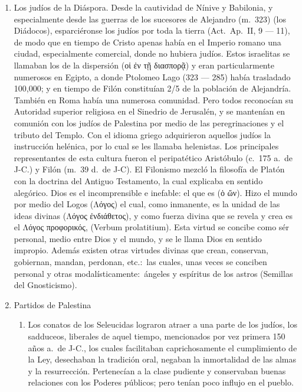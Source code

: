 \raggedbottom{} \documentclass[12pt, a4paper]{book}
\begin{document}
\begin{enumerate}
  \item Los judíos de la Diáspora. Desde la cautividad de Nínive y Babilonia, y especialmente desde las guerras de los sucesores de Alejandro (m.\ 323) (los Diádocos), esparciéronse los judíos por toda la tierra (Act.\ Ap.\ II, 9 --- 11), de modo que en tiempo de Cristo apenas había en el Imperio romano una ciudad, especialmente comercial, donde no hubiera judíos. Estos israelitas se llamaban los de la dispersión (\textgreek{οἱ ἐν τῇ διασπορᾷ}) y eran particularmente numerosos en Egipto, a donde Ptolomeo Lago (323 --- 285) había trasladado 100,000; y en tiempo de Filón constituían 2/5 de la población de Alejandría. También en Roma había una numerosa comunidad. Pero todos reconocían su Autoridad superior religiosa en el Sinedrio de Jerusalén, y se mantenían en comunión con los judíos de Palestina por medio de las peregrinaciones y el tributo del Templo. Con el idioma griego adquirieron aquellos judíos la instrucción helénica, por lo cual se les llamaba helenistas. Los principales representantes de esta cultura fueron el peripatético Aristóbulo (c.\ 175 a.\ de J-C.) y Filón (m.\ 39 d.\ de J-C). El Filonismo mezcló la filosofía de Platón con la doctrina del Antiguo Testamento, la cual explicaba en sentido alegórico. Dios es el incomprensible e inefable: el que es (\textgreek{ὁ ὤν}). Hizo el mundo por medio del Logos (\textgreek{Λόγος}) el cual, como inmanente, es la unidad de las ideas divinas (\textgreek{Λόγος ἐνδιάθετος}), y como fuerza divina que se revela y crea es el \textgreek{Λόγος προφορικός}, (Verbum prolatitium). Esta virtud se concibe como sér personal, medio entre Dios y el mundo, y se le llama Dios en sentido impropio. Además existen otras virtudes divinas que crean, conservan, gobiernan, mandan, perdonan, etc.:\ las cuales, unas veces se conciben personal y otras modalísticamente:\ ángeles y espíritus de los astros (Semillas del Gnosticismo).
  \item Partidos de Palestina \begin{enumerate}
    \item Los conatos de los Seleucidas lograron atraer a una parte de los judíos, los sadduceos, liberales de aquel tiempo, mencionados por vez primera 150 años a.\ de J-C., los cuales facilitaban caprichosamente el cumplimiento de la Ley, desechaban la tradición oral, negaban la inmortalidad de las almas y la resurrección. Pertenecían a la clase pudiente y conservaban buenas relaciones con los Poderes públicos; pero tenían poco influjo en el pueblo.

\end{enumerate}
\end{enumerate}
\end{document}
